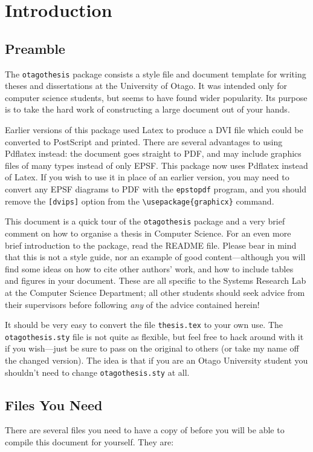 \chapter{Introduction}

\section{Preamble}

The {\tt otagothesis} package consists a style file and document
template for writing theses and dissertations at the University of
Otago.  It was intended only for computer science students, but seems
to have found wider popularity.  Its purpose is to take the hard work
of constructing a large document out of your hands.

Earlier versions of this package used Latex to produce a DVI file
which could be converted to PostScript and printed.  There are several
advantages to using Pdflatex instead: the document goes straight to
PDF, and may include graphics files of many types instead of only
EPSF.  This package now uses Pdflatex instead of Latex.  If you wish
to use it in place of an earlier version, you may need to convert any
EPSF diagrams to PDF with the \verb|epstopdf| program, and you should
remove the \verb|[dvips]| option from the \verb|\usepackage{graphicx}|
command.

This document is a quick tour of the {\tt otagothesis} package and a
very brief comment on how to organise a thesis in Computer Science.
For an even more brief introduction to the package, read the README
file.  Please bear in mind that this is not a style guide, nor an
example of good content---although you will find some ideas on how
to cite other authors' work, and how to include tables and figures in
your document.  These are all specific to the Systems Research Lab at
the Computer Science Department; all other students should seek advice
from their supervisors before following {\em any} of the advice
contained herein!

It should be very easy to convert the file {\tt thesis.tex} to
your own use.
The {\tt otagothesis.sty} file is not quite as flexible, but feel
free to hack around with it if you wish---just be sure to pass on
the original to others (or take my name off the changed version).
The idea is that if you are an Otago University student
you shouldn't need to change {\tt otagothesis.sty} at all.

\section{Files You Need}
\label{sec:files}
There are several files you need to have a copy of before you will be
able to compile this document for yourself.  They are:

